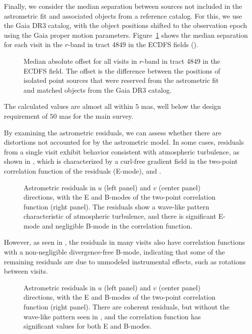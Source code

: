 Finally, we consider the median separation between sources not included in the astrometric fit and associated objects from a reference catalog.
For this, we use the Gaia \gls{DR3} catalog, with the object positions shifted to the observation epoch using the Gaia proper motion parameters.
Figure~\ref{fig:AA1} shows the median separation for each visit in the $r$-band in \gls{tract} 4849 in the ECDFS fields ().
\begin{figure}[htb!]
\caption{Median absolute offset for all visits in $r$-band in \gls{tract} 4849 in the ECDFS field. 
The offset is the difference between the positions of isolated point sources that were reserved from the astrometric fit and matched objects from the Gaia DR3 catalog.}
\label{fig:AA1}
\end{figure}
The calculated values are almost all within $5$\xspace mas, well below the design requirement of $50$\xspace mas for the main survey.

By examining the astrometric residuals, we can assess whether there are distortions not accounted for by the astrometric model. 
In some cases, residuals from a single visit exhibit behavior consistent with atmospheric turbulence, as shown in , which is characterized by a curl-free gradient field in the two-point correlation function of the residuals (E-mode),  \citet{Leget2021} and \citet{Fortino2021}. 
\begin{figure}[htb!]
\caption{\small Astrometric residuals in $u$ (left panel) and $v$ (center panel) directions, with the E and B-modes of the two-point correlation function (right panel). 
The residuals show a wave-like pattern characteristic of atmospheric turbulence, and there is significant E-mode and negligible B-mode in the correlation function.}
\label{fig:Astrometry_Emode}
\end{figure}

However, as seen in , the residuals in many visits also have correlation functions with a non-negligible divergence-free B-mode, indicating that some of the remaining residuals are due to unmodeled instrumental effects, such as rotations between visits.
\begin{figure}[htb!]
\caption{\small Astrometric residuals in $u$ (left panel) and $v$ (center panel) directions, with the E and B-modes of the two-point correlation function (right panel). 
There are coherent residuals, but without the wave-like pattern seen in , and the correlation function has significant values for both E and B-modes.}
\label{fig:Astrometry_EBmode}
\end{figure}

